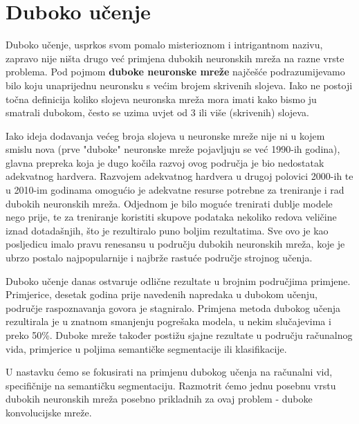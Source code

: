 \section{Duboko učenje}
Duboko učenje, usprkos svom pomalo misterioznom i intrigantnom nazivu, zapravo nije ništa drugo već primjena dubokih neuronskih mreža na razne vrste problema. Pod pojmom \textbf{duboke neuronske mreže} najčešće podrazumijevamo bilo koju unaprijednu neuronsku s većim brojem skrivenih slojeva. Iako ne postoji točna definicija koliko slojeva neuronska mreža mora imati kako bismo ju smatrali dubokom, često se uzima uvjet od 3 ili više (skrivenih) slojeva. \citep{IBMDeepLearning}

Iako ideja dodavanja većeg broja slojeva u neuronske mreže nije ni u kojem smislu nova (prve "duboke" neuronske mreže pojavljuju se već 1990-ih godina), glavna prepreka koja je dugo kočila razvoj ovog područja je bio nedostatak adekvatnog hardvera. Razvojem adekvatnog hardvera u drugoj polovici 2000-ih te u 2010-im godinama omogućio je adekvatne resurse potrebne za treniranje i rad dubokih neuronskih mreža. Odjednom je bilo moguće trenirati dublje modele nego prije, te za treniranje koristiti skupove podataka nekoliko redova veličine iznad dotadašnjih, što je rezultiralo puno boljim rezultatima. Sve ovo je kao posljedicu imalo pravu renesansu u području dubokih neuronskih mreža, koje je ubrzo postalo najpopularnije i najbrže rastuće područje strojnog učenja. \citep{deeplearningbook}

Duboko učenje danas ostvaruje odlične rezultate u brojnim područjima primjene. Primjerice, desetak godina prije navedenih napredaka u dubokom učenju, područje raspoznavanja govora je stagniralo. Primjena metoda dubokog učenja rezultirala je u znatnom smanjenju pogrešaka modela, u nekim slučajevima i preko 50\%. Duboke mreže također postižu sjajne rezultate u području računalnog vida, primjerice u poljima semantičke segmentacije ili klasifikacije.

U nastavku ćemo se fokusirati na primjenu dubokog učenja na računalni vid, specifičnije na semantičku segmentaciju. Razmotrit ćemo jednu posebnu vrstu dubokih neuronskih mreža posebno prikladnih za ovaj problem - duboke konvolucijske mreže.


